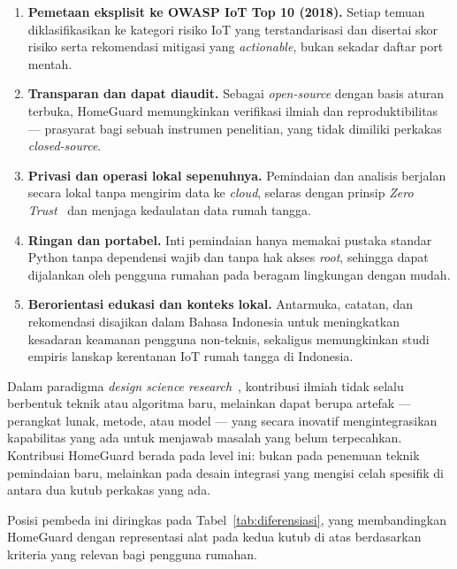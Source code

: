 \begin{enumerate}
    \item \textbf{Pemetaan eksplisit ke OWASP IoT Top 10 (2018).} Setiap
    temuan diklasifikasikan ke kategori risiko IoT yang terstandarisasi
    dan disertai skor risiko serta rekomendasi mitigasi yang
    \textit{actionable}, bukan sekadar daftar port mentah.

    \item \textbf{Transparan dan dapat diaudit.} Sebagai \textit{open-source}
    dengan basis aturan terbuka, HomeGuard memungkinkan verifikasi
    ilmiah dan reproduktibilitas --- prasyarat bagi sebuah instrumen
    penelitian, yang tidak dimiliki perkakas \textit{closed-source}.

    \item \textbf{Privasi dan operasi lokal sepenuhnya.} Pemindaian dan
    analisis berjalan secara lokal tanpa mengirim data ke \textit{cloud},
    selaras dengan prinsip \textit{Zero Trust}~\cite{b19} dan menjaga kedaulatan
    data rumah tangga.

    \item \textbf{Ringan dan portabel.} Inti pemindaian hanya memakai
    pustaka standar Python tanpa dependensi wajib dan tanpa hak akses
    \textit{root}, sehingga dapat dijalankan oleh pengguna rumahan pada
    beragam lingkungan dengan mudah.

    \item \textbf{Berorientasi edukasi dan konteks lokal.} Antarmuka,
    catatan, dan rekomendasi disajikan dalam Bahasa Indonesia untuk
    meningkatkan kesadaran keamanan pengguna non-teknis, sekaligus
    memungkinkan studi empiris lanskap kerentanan IoT rumah tangga di
    Indonesia.
\end{enumerate}

Dalam paradigma \textit{design science research}~\cite{b23}, kontribusi ilmiah
tidak selalu berbentuk teknik atau algoritma baru, melainkan dapat berupa
artefak --- perangkat lunak, metode, atau model --- yang secara inovatif
mengintegrasikan kapabilitas yang ada untuk menjawab masalah yang belum
terpecahkan. Kontribusi HomeGuard berada pada level ini: bukan pada penemuan
teknik pemindaian baru, melainkan pada desain integrasi yang mengisi celah
spesifik di antara dua kutub perkakas yang ada.

Posisi pembeda ini diringkas pada Tabel~\ref{tab:diferensiasi}, yang
membandingkan HomeGuard dengan representasi alat pada kedua kutub di atas
berdasarkan kriteria yang relevan bagi pengguna rumahan.

